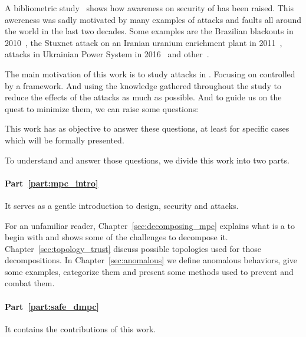 \documentclass[../main.tex]{subfiles}
\begin{document}
A bibliometric study~\cite{ZacchiaEtAl2019} shows how awareness on security of \cps{} has been raised.
This awereness was sadly motivated by many examples of attacks and faults all around the world in the last two decades.
Some examples are the Brazilian blackouts in 2010~\cite{Conti2010}, the Stuxnet attack on an Iranian uranium enrichment plant in 2011~\cite{Langner2011}, attacks in Ukrainian Power System in 2016~\cite{Bindra2017} and other~\cite{DingEtAl2018,DibajiEtAl2019}.

The main motivation of this work is to study attacks in \cps{}.
Focusing on \cps{} controlled by a \dmpc{} framework.
And using the knowledge gathered throughout the study to reduce the effects of the attacks as much as possible.
And to guide us on the quest to minimize them, we can raise some questions:

This work has as objective to answer these questions, at least for specific cases which will be formally presented.

To understand and answer those questions, we divide this work into two parts.

\paragraph{Part~\ref{part:mpc_intro}} It serves as a gentle introduction to \dmpc{} design, security and attacks.

For an unfamiliar reader, Chapter~\ref{sec:decomposing_mpc} explains what is a \mpc{} to begin with and shows some of the challenges to decompose it.
Chapter~\ref{sec:topology_trust} discuss possible topologies used for those decompositions.
In Chapter~\ref{sec:anomalous} we define anomalous behaviors, give some examples, categorize them and present some methods used to prevent and combat them.

\paragraph{Part~\ref{part:safe_dmpc}} It contains the contributions of this work.
\end{document}
